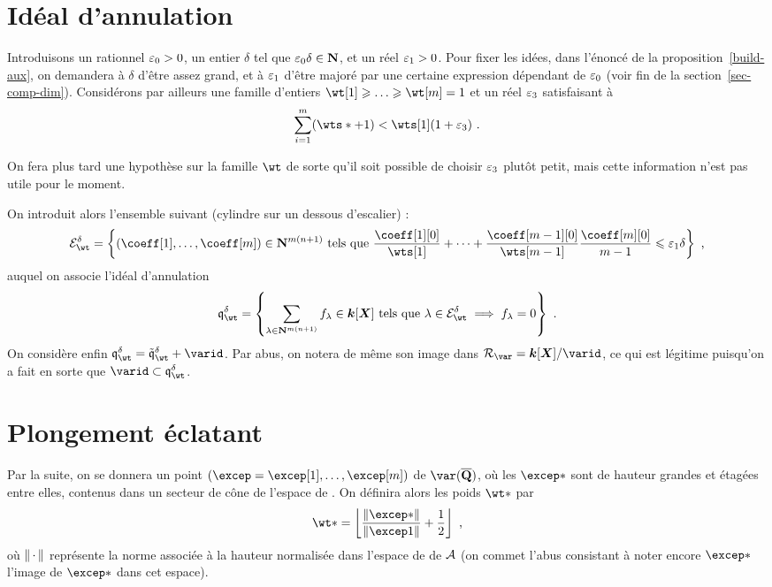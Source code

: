 \section{Idéal d'annulation}

Introduisons un rationnel ${\varepsilon_0} > 0$, un entier $\delta$ tel que
${\varepsilon_0}\delta \in {\mathbf{N}}$, et un réel ${\varepsilon_1} > 0$. Pour fixer les idées, dans
l'énoncé de la proposition~\ref{build-aux}, on demandera à $\delta$ d'être
assez grand, et à ${\varepsilon_1}$ d'être majoré par une certaine expression dépendant
de ${\varepsilon_0}$ (voir fin de la section~\ref{sec-comp-dim}). Considérons par
ailleurs une famille d'entiers $\wt[1] \ge \dots \ge \wt[\puiss] = 1$ et un
réel ${\varepsilon_3}$ satisfaisant à
\[
  \sum_{\fct=1}^\puiss (\wts* + 1) < \wts[1] (1 + \epsiii)
  \pmm.
\]

On fera plus tard une hypothèse sur la famille $\wt$ de sorte qu'il soit
possible de choisir ${\varepsilon_3}$ plutôt petit, mais cette information n'est pas
utile pour le moment.

On introduit alors l'ensemble suivant (cylindre sur un dessous d'escalier) :
\[
  \stairs = \left\{
    (\coeff[1], \dots, \coeff[\puiss]) \in \N^{m(n+1)}
    \text{ tels que }
    \frac {\coeff[1][0]} {\wts[1]}
    + \dots +
    \frac {\coeff[\puiss-1][0]} {\wts[\puiss-1]}
    \frac {\coeff[\puiss][0]} {\puiss-1}
    \le \epsi \delta
    \right\}
  \pmm,
\]
auquel on associe l'idéal d'annulation
\[
  \vanish = \left\{
    \sum_{\lambda \in \N^{\puiss(\dimp+1)}} f_\lambda
    \in \cdn [\cmmh]
    \text{ tels que }
    \lambda \in \stairs
    \implies
    f_\lambda = 0
    \right\}
  \pmm.
\]
On considère enfin $\vanish = \vanish* + \varid$. Par abus,
on notera de même son image dans $\ring\var = \cdn [\cmmh] / \varid$, ce qui
est légitime puisqu'on a fait en sorte que $\varid \subset \vanish$.

\section{Plongement éclatant}

Par la suite, on se donnera un point
$(\excep = \excep[1], \dots, \excep[\puiss])$
de $\var(\Qbar)$, où les $\excep*$ sont de hauteur grandes et étagées entre
elles, contenus dans un secteur de cône de l'espace de . On
définira alors les poids $\wt*$ par
\begin{equation}
  \wt* =
  \left\lfloor
  \frac {\norm{\excep*}} {\norm{\excep1}}
  + \frac12
  \right\rfloor
  \pmm,
\end{equation}
où $\lVert{\,\cdot\,}\rVert$ représente la norme associée à la hauteur normalisée dans
l'espace de  de $\mathcal A$ (on commet l'abus consistant à noter
encore $\excep*$ l'image de $\excep*$ dans cet espace).

